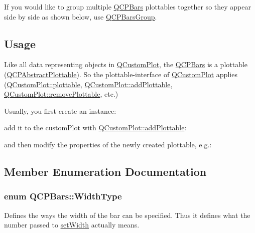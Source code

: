 If you would like to group multiple \hyperlink{classQCPBars}{Q\+C\+P\+Bars} plottables together so they appear side by side as shown below, use \hyperlink{classQCPBarsGroup}{Q\+C\+P\+Bars\+Group}.

\hypertarget{classQCPStatisticalBox_usage}{}\subsection{Usage}\label{classQCPStatisticalBox_usage}
Like all data representing objects in \hyperlink{classQCustomPlot}{Q\+Custom\+Plot}, the \hyperlink{classQCPBars}{Q\+C\+P\+Bars} is a plottable (\hyperlink{classQCPAbstractPlottable}{Q\+C\+P\+Abstract\+Plottable}). So the plottable-\/interface of \hyperlink{classQCustomPlot}{Q\+Custom\+Plot} applies (\hyperlink{classQCustomPlot_a32de81ff53e263e785b83b52ecd99d6f}{Q\+Custom\+Plot\+::plottable}, \hyperlink{classQCustomPlot_ab7ad9174f701f9c6f64e378df77927a6}{Q\+Custom\+Plot\+::add\+Plottable}, \hyperlink{classQCustomPlot_af3dafd56884208474f311d6226513ab2}{Q\+Custom\+Plot\+::remove\+Plottable}, etc.)

Usually, you first create an instance\+: 
\begin{DoxyCodeInclude}
\end{DoxyCodeInclude}
add it to the custom\+Plot with \hyperlink{classQCustomPlot_ab7ad9174f701f9c6f64e378df77927a6}{Q\+Custom\+Plot\+::add\+Plottable}\+: 
\begin{DoxyCodeInclude}
\end{DoxyCodeInclude}
and then modify the properties of the newly created plottable, e.\+g.\+: 
\begin{DoxyCodeInclude}
\end{DoxyCodeInclude}


\subsection{Member Enumeration Documentation}
\hypertarget{classQCPBars_a65dbbf1ab41cbe993d71521096ed4649}{}
\subsubsection[{Width\+Type}]{\setlength{\rightskip}{0pt plus 5cm}enum {\bf Q\+C\+P\+Bars\+::\+Width\+Type}}\label{classQCPBars_a65dbbf1ab41cbe993d71521096ed4649}
Defines the ways the width of the bar can be specified. Thus it defines what the number passed to \hyperlink{classQCPBars_afec6116579d44d5b706e0fa5e5332507}{set\+Width} actually means.

